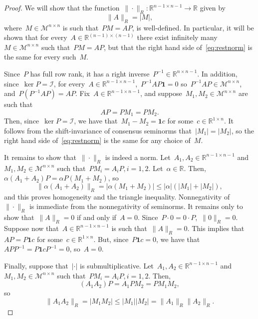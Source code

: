 \documentclass[10pt,a4paper]{amsart}
\newcommand{\R}{\mathbb R}
\newcommand{\consubsp}{\mathcal{I}} %
\newcommand{\eqrowsum}{\mathcal{M}} %
\newcommand{\gensn}[1]{|#1|} %
\newcommand{\restnorm}[1]{\|#1\|_R} %
\newcommand{\vecsn}[1]{|#1|} %
\begin{document}
\begin{proof}
    We will show that the function~$\restnorm{\cdot} : \R^{n-1 \times n -1} \to \R$ given by
    \begin{equation}\label{eq:restnorm}
        \restnorm{A} = \vecsn{M},
    \end{equation}
    where~$M \in \eqrowsum^{n \times n}$ is such that~$PM = AP$, is well-defined. In particular, it will be shown that for every~$A \in \R^{(n-1) \times (n-1)}$ there exist infinitely many~$M \in \eqrowsum^{n \times n}$ such that~$PM = AP$, but that the right hand side of~\eqref{eq:restnorm} is the same for every such~$M$.
    
    Since~$P$ has full row rank, it has a right inverse~$P^{-1} \in \R^{n \times n-1}$. In addition, since~$\ker P = \consubsp$, for every~$A \in \R^{n-1 \times n-1}$,~$P^{-1}AP\mathbf{1} = 0$ so~$P^{-1}AP \in \eqrowsum^{n \times n}$, and~$P(P^{-1}AP) = AP$. Fix~$A \in \R^{n-1 \times n-1}$, and suppose~$M_1,M_2 \in \eqrowsum^{n\times n}$ are such that
    \begin{equation}
        AP = PM_1 = PM_2.
    \end{equation}
    Then, since~$\ker P = \consubsp$, we have that~$M_1-M_2 = \mathbf{1} c$ for some~$c \in \R^{1 \times n}$. It follows from the shift-invariance of consensus seminorms that~$\vecsn{M_1} = \vecsn{M_2}$, so the right hand side of~\eqref{eq:restnorm} is the same for any choice of~$M$.

    It remains to show that~$\restnorm{\cdot}$ is indeed a norm. Let~$A_1,A_2 \in \R^{n-1 \times n-1}$ and~$M_1,M_2 \in \eqrowsum^{n \times n}$ such that~$PM_i=A_iP, i=1,2$. Let~$\alpha \in \R$. Then,~$\alpha(A_1 + A_2)P = \alpha P(M_1 + M_2)$, so
    \begin{equation}
        \restnorm{\alpha(A_1 + A_2)} = \vecsn{\alpha(M_1 + M_2)} \le |\alpha|(\vecsn{M_1} + \vecsn{M_2}),
    \end{equation}
    and this proves homogeneity and the triangle inequality. Nonnegativity of~$\restnorm{\cdot}$ is immediate from the nonnegativity of seminorms. It remains only to show that~$\restnorm{A} = 0$ if and only if~$A = 0$. Since~$P \cdot 0 = 0 \cdot P$,~$\restnorm{0} = 0$. Suppose now that~$A \in \R^{n-1 \times n-1}$ is such that~$\restnorm{A} = 0$. This implies that~$AP = P\mathbf{1}c$ for some~$c \in \R^{1 \times n}$. But, since~$P\mathbf{1}c = 0$, we have that~$APP^{-1} = P\mathbf{1}cP^{-1} = 0$, so~$A = 0$.
    
    Finally, suppose that~$\gensn{\cdot}$ is submultiplicative. Let~$A_1,A_2 \in \R^{n-1 \times n-1}$ and~$M_1,M_2 \in \eqrowsum^{n \times n}$ such that~$PM_i=A_iP, i=1,2$. Then,
    \begin{equation}
        (A_1 A_2)P = A_1 PM_2 = PM_1 M_2,
    \end{equation}
    so
    \begin{equation}
        \restnorm{A_1 A_2} = \vecsn{M_1 M_2} \le \vecsn{M_1}\vecsn{M_2} = \restnorm{A_1}\restnorm{A_2}.
    \end{equation}
\end{proof}
\end{document}
